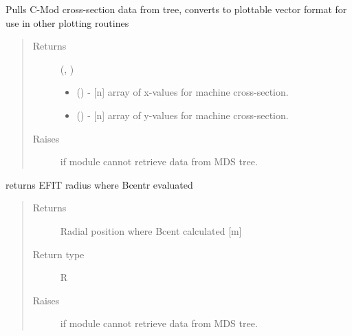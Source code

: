 \documentclass[letterpaper,10pt,english]{sphinxmanual}
\begin{document}
\begin{fulllineitems}
\begin{fulllineitems}
\end{fulllineitems}


\begin{fulllineitems}
\label{\detokenize{eqtools:eqtools.CModEFIT.CModEFITTree.getMachineCrossSectionFull}}
Pulls C-Mod cross-section data from tree, converts to plottable
vector format for use in other plotting routines
\begin{quote}\begin{description}
\item[{Returns}] \leavevmode

(, )
\begin{itemize}
\item {} 
 () - {[}n{]} array of x-values for machine cross-section.

\item {} 
 () - {[}n{]} array of y-values for machine cross-section.

\end{itemize}


\item[{Raises}] \leavevmode
{} \textendash{} if module cannot retrieve data from MDS tree.

\end{description}\end{quote}

\end{fulllineitems}


\begin{fulllineitems}
\label{\detokenize{eqtools:eqtools.CModEFIT.CModEFITTree.getRCentr}}
returns EFIT radius where Bcentr evaluated
\begin{quote}\begin{description}
\item[{Returns}] \leavevmode
Radial position where Bcent calculated {[}m{]}

\item[{Return type}] \leavevmode
R

\item[{Raises}] \leavevmode
{} \textendash{} if module cannot retrieve data from MDS tree.

\end{description}\end{quote}

\end{fulllineitems}


\end{fulllineitems}
\end{document}
